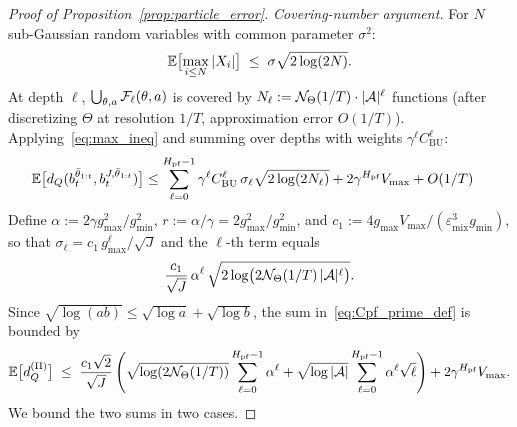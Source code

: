 \begin{proof}[Proof of Proposition~\ref{prop:particle_error}]
    \emph{Covering-number argument.} For $N$ sub-Gaussian random variables with common parameter $\sigma^2$:
    \begin{equation}\label{eq:max_ineq}
    \mathbb{E}\bigl[\max_{i\le N}|X_i|\bigr]
    \;\le\;
    \sigma\sqrt{2\log(2N)}.
    \end{equation} 
    At depth $\ell$, $\bigcup_{\theta,a}{\mathcal{F}}_\ell(\theta,a)$ is covered by $N_\ell:={\mathcal{N}}_\Theta(1/T)\cdot|{\mathcal{A}}|^\ell$ functions (after discretizing $\Theta$ at resolution $1/T$, approximation error $O(1/T)$). Applying~\eqref{eq:max_ineq} and summing over depths with weights $\gamma^\ell C_{\mathrm{BU}}^\ell$:
    \begin{align}
    \mathbb{E}\bigl[d_Q(b_t^{\bar\theta_{1:t}},b_t^{J,\bar\theta_{1:t}})\bigr]
    &\le\sum_{\ell=0}^{H_{\mathrm{pf}}-1}\gamma^\ell C_{\mathrm{BU}}^\ell\,\sigma_\ell\sqrt{2\log(2N_\ell)}+2\gamma^{H_{\mathrm{pf}}} V_{\max}+O(1/T)
    \label{eq:Cpf_prime_def}
    \end{align} 
    Define $\alpha:=2\gamma g_{\max}^2/g_{\min}^2$, $r:=\alpha/\gamma=2g_{\max}^2/g_{\min}^2$, and $c_1:=4g_{\max}V_{\max}/(\varepsilon_{\mathrm{mix}}^3 g_{\min})$, so that $\sigma_\ell=c_1\,g_{\max}^\ell/\sqrt{J}$ and the $\ell$-th term equals 
\[ 
\frac{c_1}{\sqrt{J}}\,\alpha^\ell\,\sqrt{2\log\bigl(2{\mathcal{N}}_\Theta(1/T)\,|{\mathcal{A}}|^\ell\bigr)}. 
\]
Since $\sqrt{\log(ab)}\le\sqrt{\log a}+\sqrt{\log b}$, the sum in~\eqref{eq:Cpf_prime_def} is bounded by
\begin{equation}\label{eq:pf_balance}
\mathbb{E}\bigl[d_Q^{\mathrm{(II)}}\bigr]
\;\le\;
\frac{c_1\sqrt{2}}{\sqrt{J}}\,\Biggl( 
\sqrt{\log(2{\mathcal{N}}_\Theta(1/T))}\sum_{\ell=0}^{H_{\mathrm{pf}}-1}\alpha^\ell
+\sqrt{\log|{\mathcal{A}}|}\sum_{\ell=0}^{H_{\mathrm{pf}}-1}\alpha^\ell\sqrt{\ell}
\Biggr)
+2\gamma^{H_{\mathrm{pf}}} V_{\max}.
\end{equation}
We bound the two sums in two cases.


\end{proof}
